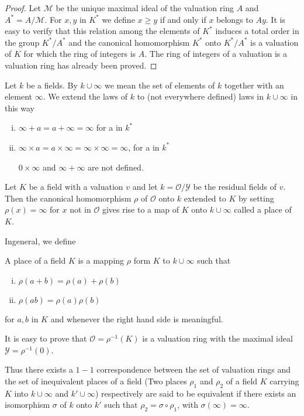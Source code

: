 \begin{proof}
  Let $\mathcal{M}$ be the unique maximal ideal of the valuation ring
  $A$ and $A^* = A /\mathcal{M}$. For  $x,y$ in $K^*$ we define $x \geq
  y$ if and only if $x$ belongs to $Ay$. It is easy to verify that
  this relation among the elements of $K^*$ induces a total order in
  the group $K^* / A^*$ and the canonical homomorphism $K^*$ onto $K^*
  / A^*$ is a valuation of $K$ for which the ring of integers is
  $A$. The ring of integers of a valuation is a valuation ring has
  already been proved. 
\end{proof}

Let $k$ be a fields. By $k \cup \infty$ we mean the set of elements of $k$
together with an element $\infty$. We extend the laws of $k$ to (not
everywhere defined) laws in $k \cup \infty$ in this way  
\begin{enumerate}[(i)]
\item $\infty + a = a + \infty = \infty $ for a in $k^*$ 
\item $\infty \times a = a \times \infty = \infty \times \infty =
  \infty$, for a in $k^*$

  $0 \times \infty$ and $\infty + \infty$ are not defined.
\end{enumerate}

Let $K$ be a field with a valuation $v$ and let $k = \mathscr{O} /
\mathscr{Y}$ be the residual fields of $v$. Then the canonical
homomorphism $\rho$ of $ \mathscr{O}$ onto $k$ extended to $K$ by
setting $\rho (x) = \infty$ for $x$ not in $\mathscr{O}$ gives rise to
a map of $K$ onto $k \cup \infty$ called a place of $K$. 

In\pageoriginale general, we define 

A place of a field $K$ is a mapping $\rho$ form $K$ to $k \cup \infty$
such that  
\begin{enumerate}[(i)]
\item $\rho (a + b ) = \rho (a) + \rho (b)$
\item $\rho (a  b ) = \rho (a)  \rho (b)$
\end{enumerate}
for $a, b$ in $K$ and whenever the right hand side is meaningful. 

It is easy to prove that $\mathscr{O} = \rho^{-1} (K)$ is a valuation
ring with the maximal ideal $\mathscr{Y} = \rho^{-1}(0)$. 

Thus there exists a $1-1$ correspondence between the set of valuation
rings and the set of inequivalent places of a field (Two places $\rho_1$
and $\rho_2$ of a field $K$ carrying $K$ into $k \cup \infty$ and $k' \cup
\infty $) respectively are said to be equivalent if there exists an
isomorphism $\sigma$ of $k$ onto $k'$ such that $\rho_2 = \sigma \circ
\rho_1$, with $\sigma (\infty ) = \infty$. 

